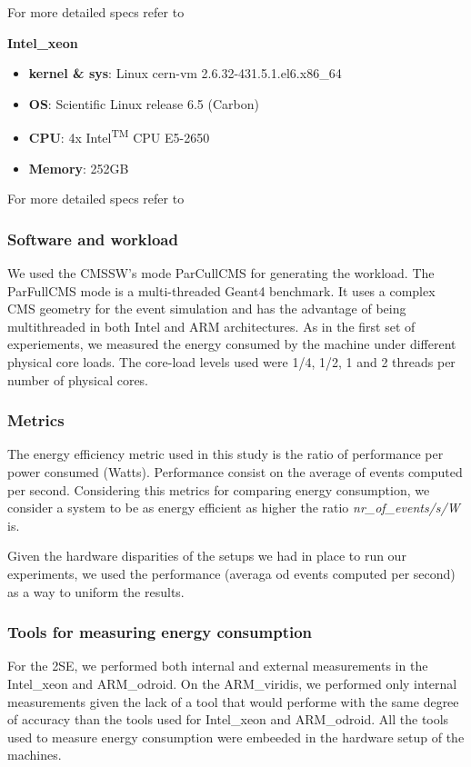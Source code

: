 For more detailed specs refer to \cite{odroid_specs}


\vspace{10mm}
\textbf{Intel\_xeon}
\begin{itemize}
  \item[] \textbf{kernel \& sys}:  Linux cern-vm 2.6.32-431.5.1.el6.x86\_64
  \item[] \textbf{OS}: Scientific Linux release 6.5 (Carbon)
  \item[] \textbf{CPU}:    4x Intel\textsuperscript{TM} CPU E5-2650
  \item[] \textbf{Memory}:        252GB
\end{itemize}

For more detailed specs refer to \cite{xeon_specs}




\subsubsection*{Software and workload}
We used the CMSSW's mode ParCullCMS for generating the workload. The ParFullCMS mode is a multi-threaded Geant4 \cite{GEANT4} benchmark. It uses a complex CMS geometry for the event simulation and has the advantage of being multithreaded in both Intel and ARM architectures. As in the first set of experiements, we measured the energy consumed by the machine under different physical core loads. The core-load levels used were 1/4, 1/2, 1 and 2 threads per number of physical cores. 

\subsubsection*{Metrics}
The energy efficiency metric used in this study is the ratio of performance per power consumed (Watts). Performance consist on the average of events computed per second. Considering this metrics for comparing energy consumption, we consider a system to be as energy efficient as higher the ratio \textit{nr\_of\_events/s/W} is.

Given the hardware disparities of the setups we had in place to run our experiments, we used the performance (averaga od events computed per second) as a way to uniform the results.

\subsubsection*{Tools for measuring energy consumption}
For the 2SE, we performed both internal and external measurements in the Intel\_xeon and ARM\_odroid. On the ARM\_viridis, we performed only internal measurements given the lack of a tool that would performe with the same degree of accuracy than the tools used for Intel\_xeon and ARM\_odroid. All the tools used to measure energy consumption were embeeded in the hardware setup of the machines.

